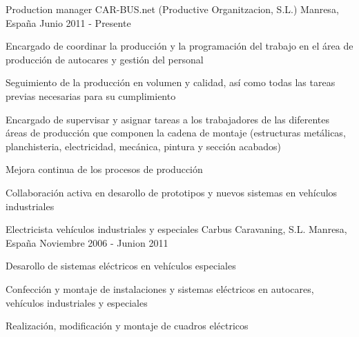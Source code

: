

\begin{cventries}

  \cventry
    {Production manager} %
    {CAR-BUS.net (Productive Organitzacion, S.L.)} %
    {Manresa, España} %
    {Junio 2011 - Presente} %
    {
      \begin{cvitems} %
        \item {Encargado de coordinar la producción y la programación del trabajo en el área de producción de autocares y gestión del personal}
        \item {Seguimiento de la producción en volumen y calidad, así como todas las tareas previas necesarias para su cumplimiento}
        \item {Encargado de supervisar y asignar tareas a los trabajadores de las diferentes áreas de producción que componen la cadena de montaje (estructuras metálicas, planchisteria, electricidad, mecánica, pintura y sección acabados)}
        \item {Mejora continua de los procesos de producción}
        \item {Collaboración activa en desarollo de prototipos y nuevos sistemas en vehículos industriales}
      \end{cvitems}
    }

  \cventry
    {Electricista vehículos industriales y especiales} %
    {Carbus Caravaning, S.L.} %
    {Manresa, España} %
    {Noviembre 2006 - Junion 2011} %
    {
      \begin{cvitems} %
        \item {Desarollo de sistemas eléctricos en vehículos especiales}
        \item {Confección y montaje de instalaciones y sistemas eléctricos en autocares, vehículos industriales y especiales}
        \item {Realización, modificación y montaje de cuadros eléctricos}
      \end{cvitems}
    }


\end{cventries}
